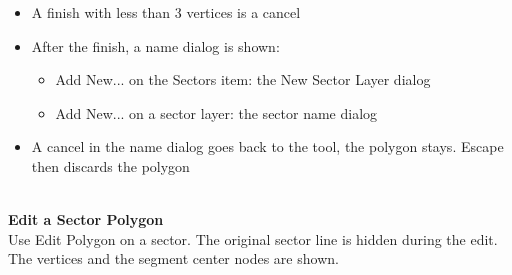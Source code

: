 \begin{itemize}
 \item A finish with less than 3 vertices is a cancel
 \item After the finish, a name dialog is shown:
 \begin{itemize}
  \item Add New... on the Sectors item: the New Sector Layer dialog
  \item Add New... on a sector layer: the sector name dialog
 \end{itemize}
 \item A cancel in the name dialog goes back to the tool, the polygon stays. Escape then discards the polygon
\end{itemize}
\ \\

\textbf{Edit a Sector Polygon} \\

Use Edit Polygon on a sector. The original sector line is hidden during the edit. The vertices and the segment center nodes are shown.


